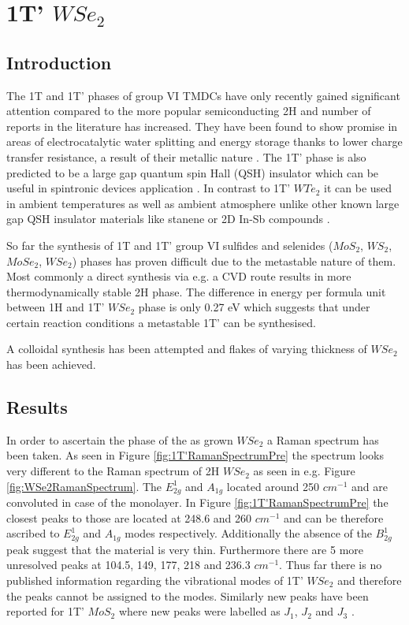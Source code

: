 \chapter{1T' $WSe_2$}

\section{Introduction}

The 1T and 1T' phases of group VI TMDCs have only recently gained significant attention compared to the more popular semiconducting 2H and number of reports in the literature has increased. They have been found to show promise in areas of electrocatalytic water splitting and energy storage thanks to lower charge transfer resistance\cite{Voiry2013}, a result of their metallic nature \cite{Wypych1992}. The 1T' phase is also predicted to be a large gap quantum spin Hall (QSH) insulator which can be useful in spintronic devices  application \cite{Chen2018}. In contrast to 1T' $WTe_2$ \cite{Fei2017} it can be used in ambient temperatures as well as ambient atmosphere unlike other known large gap QSH insulator materials like stanene \cite{Xu2013} or 2D In-Sb compounds \cite{Gruznev2018}. 

So far the synthesis of 1T and 1T' group VI sulfides and selenides ($MoS_2$, $WS_2$, $MoSe_2$, $WSe_2$)  phases has proven difficult due to the metastable nature of them. Most commonly a direct synthesis via e.g. a CVD route results in more thermodynamically stable 2H phase. The difference in energy per formula unit between 1H and 1T' $WSe_2$ phase is only 0.27 eV which suggests that under certain reaction conditions a metastable 1T' can be synthesised.

A colloidal synthesis has been attempted and flakes of varying thickness of $WSe_2$ has been achieved. 

\section{Results}

In order to ascertain the phase of the as grown $WSe_2$ a Raman spectrum has been taken. As seen in Figure \ref{fig:1T'RamanSpectrumPre} the spectrum looks very different to the Raman spectrum of 2H $WSe_2$ as seen in e.g. Figure \ref{fig:WSe2RamanSpectrum}. The $E^1_{2g}$ and $A_{1g}$ located around 250 $cm^{-1}$ and are convoluted in case of the monolayer. In Figure \ref{fig:1T'RamanSpectrumPre} the closest peaks to those are located at 248.6 and 260 $cm^{-1}$ and can be therefore ascribed to $E^1_{2g}$ and $A_{1g}$ modes respectively. Additionally the absence of the $B^1_{2g}$ peak suggest that the material is very thin. Furthermore there are 5 more unresolved peaks at 104.5, 149, 177, 218 and 236.3 $cm^{-1}$. Thus far there is no published information regarding the vibrational modes of 1T' $WSe_2$ and therefore the peaks cannot be assigned to the modes. Similarly new peaks have been reported for 1T' $MoS_2$ where new peaks were labelled as $J_1$, $J_2$ and $J_3$ \cite{Yu2018}.

